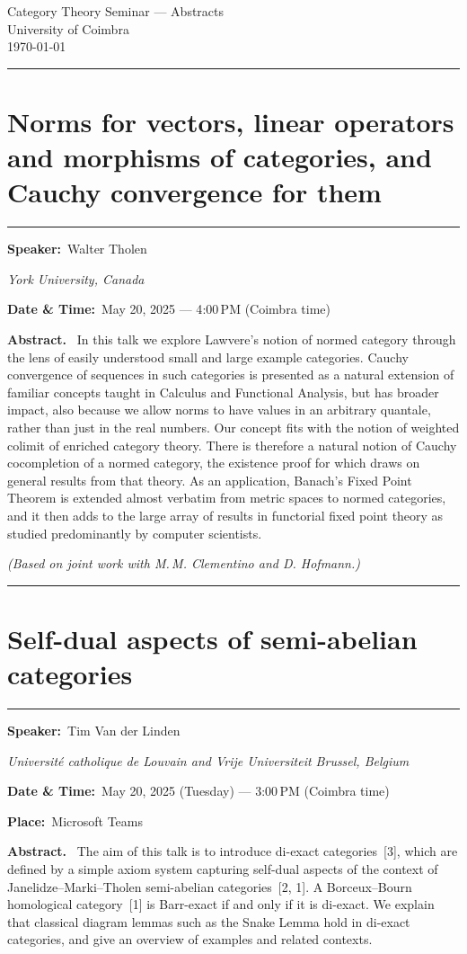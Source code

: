 \documentclass[11pt,a4paper]{article}
\newcommand{\Title}[1]{\section*{#1}\vspace{-0.25em}\hrule\vspace{0.8em}}
\newcommand{\Field}[2]{\textbf{#1:}~#2\par}
\newcommand{\Affil}[1]{\textit{#1}\par}
\newcommand{\Abstract}{\vspace{0.6em}\textbf{Abstract.}~}
\newcommand{\TalkBlockSep}{\vspace{1.25em}\hrule\vspace{1.25em}}
\begin{document}
\begin{center}
  {\LARGE Category Theory Seminar — Abstracts}\\[0.25em]
  {\large University of Coimbra}\\[0.5em]
  \today
\end{center}

\TalkBlockSep

\Title{Norms for vectors, linear operators and morphisms of categories, and Cauchy convergence for them}

\Field{Speaker}{Walter Tholen}
\Affil{York University, Canada}

\Field{Date \& Time}{May 20, 2025 — 4{:}00\,PM (Coimbra time)}

\Abstract
In this talk we explore Lawvere’s notion of normed category through the lens of easily understood small and large example categories.
Cauchy convergence of sequences in such categories is presented as a natural extension of familiar concepts taught in Calculus and Functional Analysis, but has broader impact, also because we allow norms to have values in an arbitrary quantale, rather than just in the real numbers.
Our concept fits with the notion of weighted colimit of enriched category theory. There is therefore a natural notion of Cauchy cocompletion of a normed category, the existence proof for which draws on general results from that theory.
As an application, Banach’s Fixed Point Theorem is extended almost verbatim from metric spaces to normed categories, and it then adds to the large array of results in functorial fixed point theory as studied predominantly by computer scientists.

\medskip
\textit{(Based on joint work with M.\,M. Clementino and D. Hofmann.)}

\TalkBlockSep

\Title{Self-dual aspects of semi-abelian categories}

\Field{Speaker}{Tim Van der Linden}
\Affil{Universit\'e catholique de Louvain and Vrije Universiteit Brussel, Belgium}

\Field{Date \& Time}{May 20, 2025 (Tuesday) — 3{:}00\,PM (Coimbra time)}
\Field{Place}{Microsoft Teams}

\Abstract
The aim of this talk is to introduce di-exact categories~[3], which are defined
by a simple axiom system capturing self-dual aspects of the context of Janelidze--Marki--Tholen
semi-abelian categories~[2, 1]. A Borceux--Bourn homological category~[1] is Barr-exact if and
only if it is di-exact. We explain that classical diagram lemmas such as the Snake Lemma hold
in di-exact categories, and give an overview of examples and related contexts.
\end{document}
